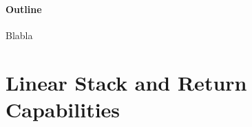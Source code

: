 \documentclass[acmsmall,review,anonymous]{acmart}\settopmatter{printfolios=true,printccs=false,printacmref=false}
\begin{document}
\paragraph{Outline} Blabla


\section{Linear Stack and Return Capabilities}
\end{document}
